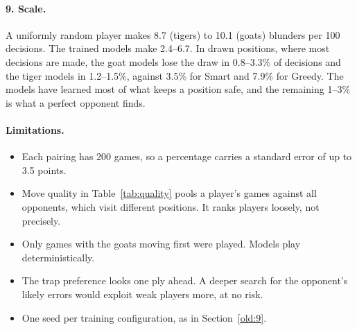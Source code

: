 \paragraph{9. Scale.} A uniformly random player makes 8.7 (tigers) to 10.1 (goats) blunders per 100
decisions. The trained models make 2.4--6.7. In drawn positions, where most decisions are made, the goat
models lose the draw in 0.8--3.3\% of decisions and the tiger models in 1.2--1.5\%, against 3.5\% for Smart
and 7.9\% for Greedy. The models have learned most of what keeps a position safe, and the remaining 1--3\% is
what a perfect opponent finds.

\paragraph{Limitations.}
\begin{itemize}
\item Each pairing has 200 games, so a percentage carries a standard error of up to 3.5 points.
\item Move quality in Table~\ref{tab:quality} pools a player's games against all opponents, which visit
  different positions. It ranks players loosely, not precisely.
\item Only games with the goats moving first were played. Models play deterministically.
\item The trap preference looks one ply ahead. A deeper search for the opponent's likely errors would
  exploit weak players more, at no risk.
\item One seed per training configuration, as in Section~\ref{old:9}.
\end{itemize}
